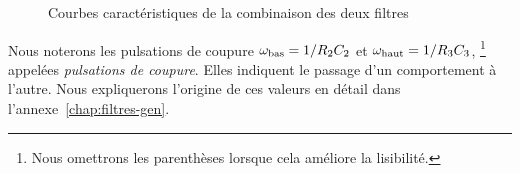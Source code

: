 \begin{figure}[h!]
    \centering
    \qquad
    \caption{Courbes caractéristiques de la combinaison des deux filtres}
    \label{fig:graphes-bande}
\end{figure}

Nous noterons les pulsations de coupure
$\omega_{\mathrm{bas}} = 1/R_2C_2$ et $\omega_{\mathrm{haut}}=1/R_3C_3$,%
\footnote{Nous omettrons les parenthèses lorsque cela améliore la lisibilité.}
appelées \emph{pulsations de coupure}.
Elles indiquent le passage d'un comportement à l'autre.
Nous expliquerons l'origine de ces valeurs en détail dans
l'annexe~\ref{chap:filtres-gen}.
